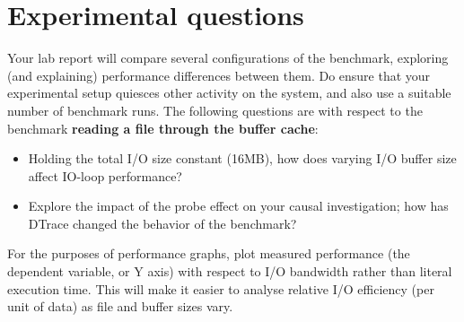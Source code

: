 \documentclass[a4paper,10pt]{article}
\begin{document}
\section*{Experimental questions}

Your lab report will compare several configurations of the benchmark,
exploring (and explaining) performance differences between them.
Do ensure that your experimental setup quiesces other activity on the
system, and also use a suitable number of benchmark runs.
The following questions are with respect to the benchmark \textbf{reading a
file through the buffer cache}:

\begin{itemize}
  \item Holding the total I/O size constant (16MB), how does varying I/O
    buffer size affect IO-loop performance?
  \item Explore the impact of the probe effect on your causal investigation;
    how has DTrace changed the behavior of the benchmark?
\end{itemize}

\noindent
For the purposes of performance graphs, plot measured performance (the
dependent variable, or Y axis) with respect to I/O bandwidth rather than
literal execution time.
This will make it easier to analyse relative I/O efficiency (per unit of data)
as file and buffer sizes vary.
\end{document}
